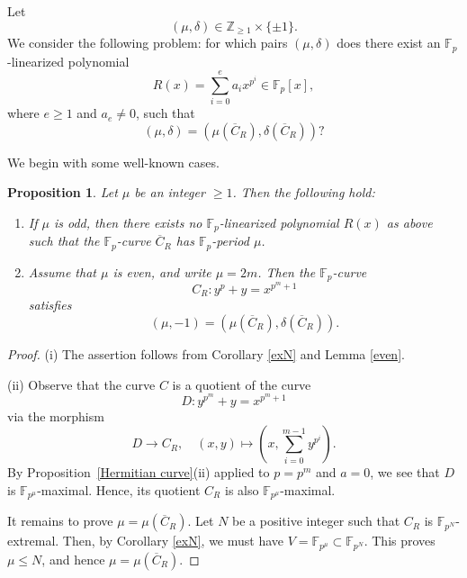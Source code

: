 \documentclass[12pt,a4paper]{amsart}
\newtheorem{proposition}[theorem]{Proposition}
\theoremstyle{definition}
\def\F{{\mathbb F}}
\def\Z{{\mathbb Z}}
\theoremstyle{remark}
\begin{document}
 Let 
 \[(\mu,\delta)\in \Z_{\geq1}\times\{\pm1\}. \]
 We consider the following problem: for which pairs $(\mu,\delta)$ does there exist an $\F_p$-linearized polynomial 
 \[
 R(x)=\sum_{i=0}^ea_ix^{p^i}\in \F_p[x], 
 \]
 where $e\geq1$ and $a_e\neq0$, such that 
 \[(\mu,\delta)=(\mu(\overline{C}_R),\delta(\overline{C}_R))?\] 

We begin with some well-known cases. 
\begin{proposition}\label{well known case for period}
Let $\mu$ be an integer $\geq1$. Then the following hold: 
\begin{enumerate}
\item If $\mu$ is odd, then there exists no $\F_p$-linearized polynomial $R(x)$ as above such that the $\F_p$-curve $\overline{C}_R$ has $\F_p$-period $\mu$. 
\item Assume that $\mu$ is even, and write $\mu=2m$. Then the $\F_p$-curve 
\[
C_R\colon y^p+y=x^{p^m+1}
\]
satisfies 
\[
(\mu,-1)=(\mu(\overline{C}_R),\delta(\overline{C}_R)). 
\]
\end{enumerate}
\end{proposition}
\begin{proof}
    (i) The assertion follows from Corollary \ref{exN} and Lemma \ref{even}. 

    (ii) Observe that the curve $C$ is a quotient of the curve 
    \[
    D\colon y^{p^m}+y=x^{p^m+1}  
    \]
    via the morphism 
    \[
    D\to C_R,\quad (x,y)\mapsto \left(x,\sum_{i=0}^{m-1}y^{p^i}\right). 
    \]
    By Proposition~\ref{Hermitian curve}(ii) applied to $p=p^m$ and $a=0$, we see that $D$ is $\F_{p^\mu}$-maximal. Hence, its quotient $C_R$ is also $\F_{p^\mu}$-maximal. 

    It remains to prove $\mu=\mu(\overline{C}_R)$. Let $N$ be a positive integer such that $C_R$ is $\F_{p^N}$-extremal. Then, by Corollary \ref{exN}, we must have $V=\F_{p^{\mu}}\subset \F_{p^N}$. This proves $\mu\leq N$, and hence $\mu=\mu(\overline{C}_R)$. 
\end{proof}
\end{document}
